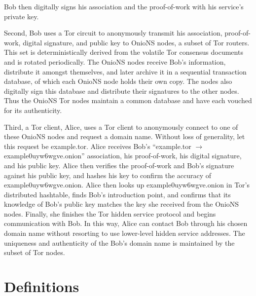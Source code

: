 Bob then digitally signs his association and the proof-of-work with his service's private key.

Second, Bob uses a Tor circuit to anonymously transmit his association, proof-of-work, digital signature, and public key to OnioNS nodes, a subset of Tor routers. This set is deterministically derived from the volatile Tor consensus documents and is rotated periodically. The OnioNS nodes receive Bob's information, distribute it amongst themselves, and later archive it in a sequential transaction database, of which each OnioNS node holds their own copy. The nodes also digitally sign this database and distribute their signatures to the other nodes. Thus the OnioNS Tor nodes maintain a common database and have each vouched for its authenticity.

Third, a Tor client, Alice, uses a Tor client to anonymously connect to one of these OnioNS nodes and request a domain name. Without loss of generality, let this request be example.tor. Alice receives Bob's ``example.tor $ \rightarrow $ example0uyw6wgve.onion'' association, his proof-of-work, his digital signature, and his public key. Alice then verifies the proof-of-work and Bob's signature against his public key, and hashes his key to confirm the accuracy of example0uyw6wgve.onion. Alice then looks up example0uyw6wgve.onion in Tor's distributed hashtable, finds Bob's introduction point, and confirms that its knowledge of Bob's public key matches the key she received from the OnioNS nodes. Finally, she finishes the Tor hidden service protocol and begins communication with Bob. In this way, Alice can contact Bob through his chosen domain name without resorting to use lower-level hidden service addresses. The uniqueness and authenticity of the Bob's domain name is maintained by the subset of Tor nodes.




\section{Definitions}

